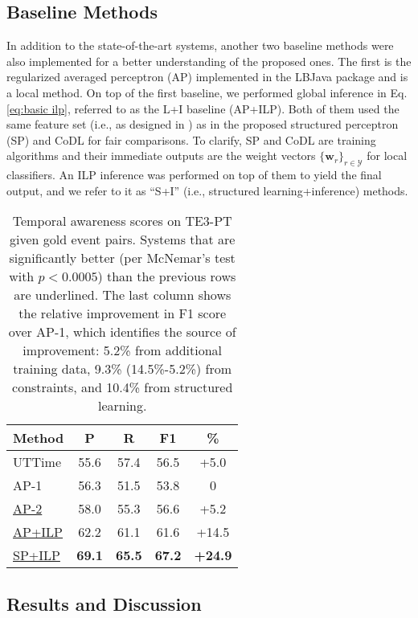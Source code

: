 \documentclass[11pt,letterpaper]{article}
\newcommand{\caly}{\mathcal{Y}}
\newcommand{\final}[1]{#1}
\begin{document}
{\subsection{Baseline Methods}
In addition to the state-of-the-art systems, another two baseline methods were also implemented for a better understanding of the proposed ones.
The first is the regularized averaged perceptron (AP) \citep{FreundSc98} implemented in the LBJava package \citep{RizzoloRo10} and \final{is} a local method. 
On top of the first baseline, we performed global inference in Eq.\eqref{eq:basic ilp}, referred to as the L+I baseline (AP+ILP).
Both of them used the same feature set \final{(i.e., as designed in \citet{DoLuRo12})}  as in the proposed structured perceptron (SP) and CoDL for fair comparisons.
To clarify, SP and CoDL are training algorithms and their immediate outputs are the weight vectors {$\{\mathbf{w}_r\}_{r\in\caly}$} for local classifiers. An ILP inference was performed on top of them to yield the final output, and we refer to it as {``S+I''} (i.e., structured learning+inference) methods.
	
\begin{table}[htbp!]
	\centering
	\caption{\small Temporal awareness scores on TE3-PT given gold event pairs. Systems that are significantly better (per McNemar's test with $p<0.0005$) than the previous rows are underlined. The last column shows the relative improvement in F1 score over AP-1, which identifies the source of improvement: 5.2\% from additional training data, 9.3\% (14.5\%-5.2\%) from constraints, and 10.4\% from structured learning.}
	\label{tab: know nones}
	\begin{tabular}{ l|c|c|c|c } 
		\hline
		Method & P & R & F1 & \%\\ 
		\hline
		UTTime & 55.6 & 57.4 & 56.5 & +5.0 \\ 
		\hline
		AP-1 & 56.3 & 51.5 & 53.8 & 0 \\
		\underline{AP-2} & 58.0 & 55.3 & 56.6 & +5.2\\ 
		\underline{AP+ILP} & 62.2 & 61.1 & 61.6 & +14.5 \\
		\hline
		\underline{SP+ILP} & \textbf{69.1} & \textbf{65.5} & \textbf{67.2} & \textbf{+24.9}\\
		\hline
	\end{tabular}
\end{table}

\subsection{Results and Discussion}
}
\end{document}
